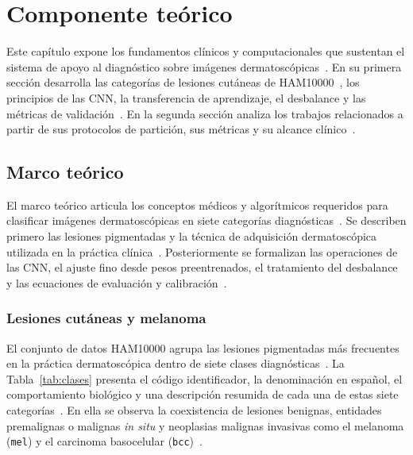 \chapter{Componente teórico}

Este capítulo expone los fundamentos clínicos y computacionales que sustentan el sistema de apoyo al diagnóstico sobre imágenes dermatoscópicas~\cite{amaral2025esmo,zhang2024dive}. En su primera sección desarrolla las categorías de lesiones cutáneas de HAM10000~\cite{tschandl2018ham10000}, los principios de las CNN, la transferencia de aprendizaje, el desbalance y las métricas de validación~\cite{maierhein2024metrics}. En la segunda sección analiza los trabajos relacionados a partir de sus protocolos de partición, sus métricas y su alcance clínico~\cite{kapoor2023leakage,barata2023reinforcement}.

\section{Marco teórico}

El marco teórico articula los conceptos médicos y algorítmicos requeridos para clasificar imá\-ge\-nes dermatoscópicas en siete categorías diagnósticas~\cite{tschandl2018ham10000}. Se describen primero las lesiones pigmentadas y la técnica de adquisición dermatoscópica utilizada en la práctica clínica~\cite{amaral2025esmo}. Posteriormente se formalizan las operaciones de las CNN, el ajuste fino desde pesos preentrenados, el tratamiento del desbalance y las ecuaciones de evaluación y calibración~\cite{zhang2024dive,maierhein2024metrics,guo2017calibration}.

\subsection{Lesiones cutáneas y melanoma}

El conjunto de datos HAM10000 agrupa las lesiones pigmentadas más frecuentes en la práctica dermatoscópica dentro de siete clases diagnósticas~\cite{tschandl2018ham10000}. La Tabla~\ref{tab:clases} presenta el código identificador, la denominación en español, el comportamiento biológico y una descripción resumida de cada una de estas siete categorías~\cite{tschandl2018ham10000}. En ella se observa la coexistencia de lesiones benignas, entidades premalignas o malignas \textit{in situ} y neoplasias malignas invasivas como el melanoma (\texttt{mel}) y el carcinoma basocelular (\texttt{bcc})~\cite{tschandl2018ham10000}.

